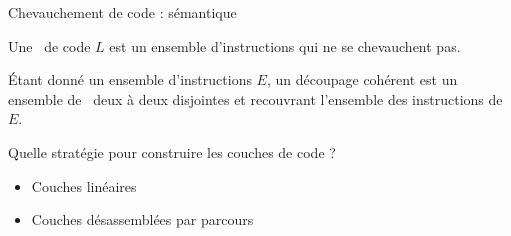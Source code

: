 \documentclass{beamer}
\begin{document}
\begin{frame}[fragile]{Chevauchement de code : sémantique}
 \begin{defi}
 Une \layer\ de code $L$ est un ensemble d'instructions qui ne se chevauchent pas. %
\label{def:layer}
\end{defi}

\begin{defi}
 Étant donné un ensemble d'instructions $E$, un découpage cohérent est un ensemble de \layers\ deux à deux disjointes et recouvrant l'ensemble des instructions de $E$.
\label{def:decoupage}
\end{defi}

\pause
Quelle stratégie pour construire les couches de code ?
\begin{itemize}
 \item Couches linéaires
 \item Couches désassemblées par parcours
\end{itemize}

\end{frame}
\end{document}
